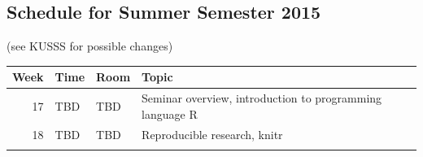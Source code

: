 \documentclass[]{article}
\begin{document}
\subsection{Schedule for Summer Semester
2015}\label{schedule-for-summer-semester-2015}

(see KUSSS for possible changes)

\begin{longtable}[c]{@{}rlll@{}}
\toprule
\begin{minipage}[b]{0.09\columnwidth}\raggedleft\strut
Week
\strut\end{minipage} &
\begin{minipage}[b]{0.15\columnwidth}\raggedright\strut
Time
\strut\end{minipage} &
\begin{minipage}[b]{0.13\columnwidth}\raggedright\strut
Room
\strut\end{minipage} &
\begin{minipage}[b]{0.51\columnwidth}\raggedright\strut
Topic
\strut\end{minipage}\tabularnewline
\midrule
\endhead
\begin{minipage}[t]{0.09\columnwidth}\raggedleft\strut
17
\strut\end{minipage} &
\begin{minipage}[t]{0.15\columnwidth}\raggedright\strut
TBD
\strut\end{minipage} &
\begin{minipage}[t]{0.13\columnwidth}\raggedright\strut
TBD
\strut\end{minipage} &
\begin{minipage}[t]{0.51\columnwidth}\raggedright\strut
Seminar overview, introduction to programming language R
\strut\end{minipage}\tabularnewline
\begin{minipage}[t]{0.09\columnwidth}\raggedleft\strut
18
\strut\end{minipage} &
\begin{minipage}[t]{0.15\columnwidth}\raggedright\strut
TBD
\strut\end{minipage} &
\begin{minipage}[t]{0.13\columnwidth}\raggedright\strut
TBD
\strut\end{minipage} &
\begin{minipage}[t]{0.51\columnwidth}\raggedright\strut
Reproducible research, knitr
\strut\end{minipage}\tabularnewline
\begin{minipage}[t]{0.09\columnwidth}\raggedleft\strut

\end{minipage}
\end{longtable}
\end{document}
